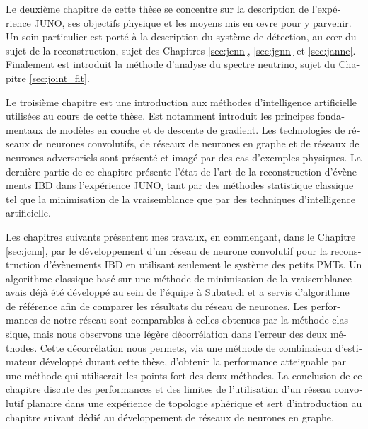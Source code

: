 \documentclass[../main.tex]{subfiles}
\begin{document}
\begin{otherlanguage}{french}
Le deuxième chapitre de cette thèse se concentre sur la description de l'expérience JUNO, ses objectifs physique et les moyens mis en \oe{}vre pour y parvenir. Un soin particulier est porté à la description du système de détection, au c\oe{}r du sujet de la reconstruction, sujet des Chapitres \ref{sec:jcnn}, \ref{sec:jgnn} et \ref{sec:janne}. Finalement est introduit la méthode d'analyse du spectre neutrino, sujet du Chapitre \ref{sec:joint_fit}.


Le troisième chapitre est une introduction aux méthodes d'intelligence artificielle utilisées au cours de cette thèse. Est notamment introduit les principes fondamentaux de modèles en couche et de descente de gradient. Les technologies de réseaux de neurones convolutifs, de réseaux de neurones en graphe et de réseaux de neurones adversoriels sont présenté et imagé par des cas d'exemples physiques. La dernière partie de ce chapitre présente l'état de l'art de la reconstruction d'évènements IBD dans l'expérience JUNO, tant par des méthodes statistique classique tel que la minimisation de la vraisemblance que par des techniques d'intelligence artificielle.


\hfill

Les chapitres suivants présentent mes travaux, en commençant, dans le Chapitre \ref{sec:jcnn}, par le développement d'un réseau de neurone convolutif pour la reconstruction d'évènements IBD en utilisant seulement le système des petits PMTs. Un algorithme classique basé sur une méthode de minimisation de la vraisemblance avais déjà été développé au sein de l'équipe à Subatech et a servis d'algorithme de référence afin de comparer les résultats du réseau de neurones. Les performances de notre réseau sont comparables à celles obtenues par la méthode classique, mais nous observons une légère décorrélation dans l'erreur des deux méthodes. Cette décorrélation nous permets, via une méthode de combinaison d'estimateur développé durant cette thèse, d'obtenir la performance atteignable par une méthode qui utiliserait les points fort des deux méthodes. La conclusion de ce chapitre discute des performances et des limites de l'utilisation d'un réseau convolutif planaire dans une expérience de topologie sphérique et sert d'introduction au chapitre suivant dédié au développement de réseaux de neurones en graphe.



\end{otherlanguage}
\end{document}
